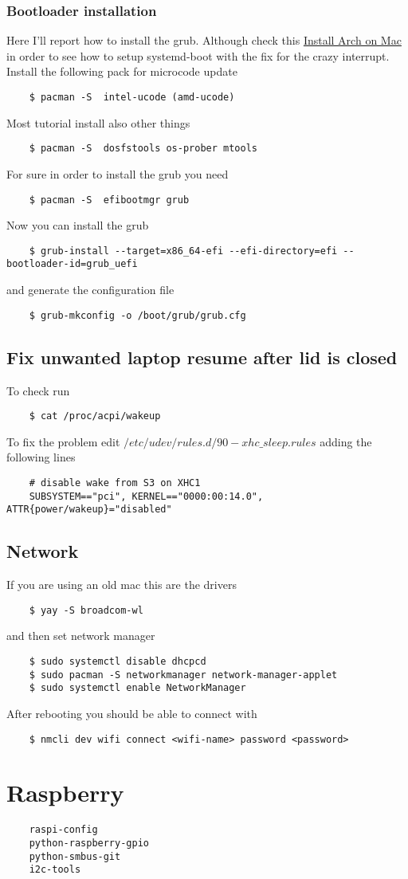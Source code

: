 \documentclass[12pt]{article}
\begin{document}
\subsubsection*{Bootloader installation}
Here I'll report how to install the grub. Although check this \href{https://medium.com/@laurynas.karvelis_95228/install-arch-linux-on-macbook-pro-11-2-retina-install-guide-for-year-2017-2034ceed4cb2}{Install Arch on Mac} in order to see how to setup systemd-boot with the fix for the crazy interrupt.
Install the following pack for microcode update
\begin{lstlisting}
    $ pacman -S  intel-ucode (amd-ucode)
\end{lstlisting}
Most tutorial install also other things
\begin{lstlisting}
    $ pacman -S  dosfstools os-prober mtools
\end{lstlisting}
For sure in order to install the grub you need
\begin{lstlisting}
    $ pacman -S  efibootmgr grub
\end{lstlisting}
Now you can install the grub
\begin{lstlisting}
    $ grub-install --target=x86_64-efi --efi-directory=efi --bootloader-id=grub_uefi
\end{lstlisting}
and generate the configuration file
\begin{lstlisting}
    $ grub-mkconfig -o /boot/grub/grub.cfg
\end{lstlisting}

\subsection*{Fix unwanted laptop resume after lid is closed}
To check run
\begin{lstlisting}
    $ cat /proc/acpi/wakeup
\end{lstlisting}
To fix the problem edit $/etc/udev/rules.d/90-xhc\_sleep.rules$ adding the following lines
\begin{lstlisting}
    # disable wake from S3 on XHC1
    SUBSYSTEM=="pci", KERNEL=="0000:00:14.0", ATTR{power/wakeup}="disabled"
\end{lstlisting}

\subsection*{Network}
If you are using an old mac this are the drivers
\begin{lstlisting}
    $ yay -S broadcom-wl
\end{lstlisting}
and then set network manager
\begin{lstlisting}
    $ sudo systemctl disable dhcpcd
    $ sudo pacman -S networkmanager network-manager-applet
    $ sudo systemctl enable NetworkManager
\end{lstlisting}
After rebooting you should be able to connect with
\begin{lstlisting}
    $ nmcli dev wifi connect <wifi-name> password <password>
\end{lstlisting}

\section*{Raspberry}
\begin{lstlisting}
    raspi-config
    python-raspberry-gpio
    python-smbus-git
    i2c-tools
\end{lstlisting}
\end{document}
